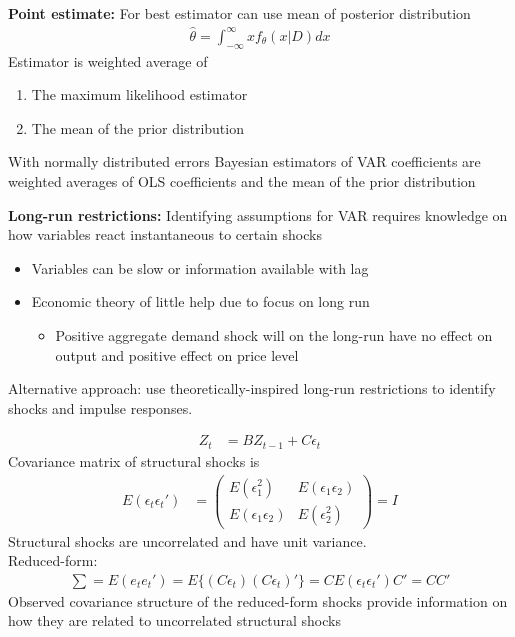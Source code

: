\documentclass{beamer}
\begin{document}
\begin{frame}
  \textbf{Point estimate:} For best estimator can use mean of posterior distribution 
\begin{align}
  \hat{\theta}= \int^\infty_{-\infty} xf_\theta(x | D)dx
\end{align}
 Estimator is weighted average of
 \begin{enumerate}
   \item The maximum likelihood estimator
  \item The mean of the prior distribution
 \end{enumerate}
 With normally distributed errors Bayesian estimators of VAR coefficients are weighted averages of OLS coefficients and the mean of the prior distribution 
\end{frame}

\begin{frame}
  \textbf{Long-run restrictions:} Identifying assumptions for VAR requires knowledge on how variables react instantaneous to certain shocks
  \begin{itemize}
    \item Variables can be slow or information available with lag
    \item Economic theory of little help due to focus on long run
    \begin{itemize}
      \item Positive aggregate demand shock will on the long-run have no effect on output and positive effect on price level
    \end{itemize}
  \end{itemize}
  \medskip
  Alternative approach: use theoretically-inspired long-run restrictions to identify shocks and impulse responses.
\end{frame}

\begin{frame}
  \begin{align}
    Z_t&= BZ_{t-1}+C\epsilon_t    
  \end{align}
  Covariance matrix of structural shocks is
  \begin{align}
    E(\epsilon_t \epsilon_t') &= \begin{pmatrix} E(\epsilon_1^2) & E(\epsilon_1 \epsilon_2) \\ E(\epsilon_1 \epsilon_2) & E(\epsilon_2^2) \end{pmatrix} = I
  \end{align}
  \medskip
  Structural shocks are uncorrelated and have unit variance.\\
  Reduced-form:
  \begin{align}
    \sum = E(e_t e_t') = E \{(C\epsilon_t) (C\epsilon_t)'\} = CE(\epsilon_t \epsilon_t')C' = CC'
  \end{align}
  Observed covariance structure of the reduced-form shocks provide information on how they are related to uncorrelated structural shocks
\end{frame}
\end{document}
